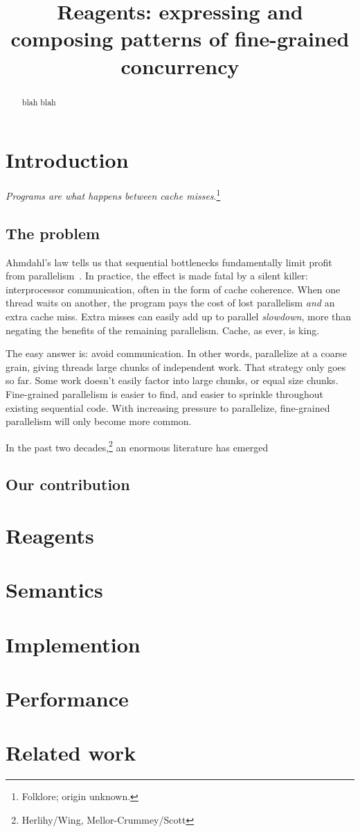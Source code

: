 \documentclass[preprint]{sigplanconf}
\begin{document}
\authorinfo{}{}{}
\title{Reagents: expressing and composing patterns of fine-grained concurrency}
\maketitle

\begin{abstract}
blah blah
\end{abstract}

\section{Introduction}

\emph{Programs are what happens between cache
  misses}.\footnote{Folklore; origin unknown.}

\subsection*{The problem}

Ahmdahl's law tells us that sequential bottlenecks fundamentally limit
profit from parallelism~\cite{?}.  In practice, the effect is made
fatal by a silent killer: interprocessor communication, often in the
form of cache coherence.  When one thread waits on another, the
program pays the cost of lost parallelism \emph{and} an extra cache
miss.  Extra misses can easily add up to parallel \emph{slowdown},
more than negating the benefits of the remaining parallelism.  Cache,
as ever, is king.

The easy answer is: avoid communication.  In other words, parallelize
at a coarse grain, giving threads large chunks of independent work.
That strategy only goes so far.  Some work doesn't easily factor into
large chunks, or equal size chunks.  Fine-grained parallelism is
easier to find, and easier to sprinkle throughout existing sequential
code.  With increasing pressure to parallelize, fine-grained
parallelism will only become more common.

In the past two decades,\footnote{Herlihy/Wing, Mellor-Crummey/Scott}
an enormous literature has emerged 

\subsection*{Our contribution}

\section{Reagents}

\section{Semantics}

\section{Implemention}

\section{Performance}

\section{Related work}


\end{document}
